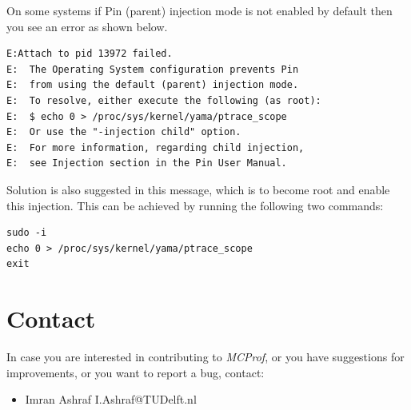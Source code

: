 \documentclass[11pt]{article}
\newcommand{\MCPROF}{\emph{MCProf}}
\begin{document}
On some systems if Pin (parent) injection mode is not enabled by default then
you see an error as shown below.

{
\small
\begin{Verbatim}[frame=single, samepage=true]
E:Attach to pid 13972 failed. 
E:  The Operating System configuration prevents Pin
E:  from using the default (parent) injection mode.
E:  To resolve, either execute the following (as root):
E:  $ echo 0 > /proc/sys/kernel/yama/ptrace_scope
E:  Or use the "-injection child" option.
E:  For more information, regarding child injection,
E:  see Injection section in the Pin User Manual.
\end{Verbatim}
}

Solution is also suggested in this message, which is to become root and enable
this injection. This can be achieved by running the following two commands:

{
\small
\begin{Verbatim}[frame=single, samepage=true]
sudo -i
echo 0 > /proc/sys/kernel/yama/ptrace_scope
exit
\end{Verbatim}
}


\section{Contact}
\label{sec:contact}

In case you are interested in contributing to \MCPROF{}, or you have suggestions
for improvements, or you want to report a bug, contact:

\begin{itemize}
\item Imran Ashraf \textlangle I.Ashraf@TUDelft.nl \textrangle
\end{itemize}




\end{document}
